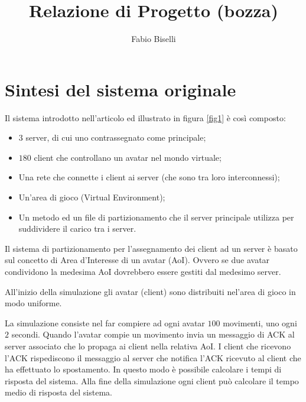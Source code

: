 \documentclass{article}
\author{Fabio Biselli}
\title{Relazione di Progetto (bozza)}
\date{}
\begin{document}
\maketitle

\section{Sintesi del sistema originale}
Il sistema introdotto nell'articolo ed illustrato in figura \ref{fig1}
è così composto:
\begin{itemize}
\item
$3$ server, di cui uno contrassegnato come principale;
\item
$180$ client che controllano un avatar nel mondo virtuale;
\item
Una rete che connette i client ai server (che sono tra loro interconnessi);
\item
Un'area di gioco (Virtual Environment);
\item
Un metodo ed un file di partizionamento che il server principale utilizza per
suddividere il carico tra i server.
\end{itemize}

Il sistema di partizionamento per l'assegnamento dei client ad un server è
basato sul concetto di Area d'Interesse di un avatar (AoI). Ovvero se due
avatar condividono la medesima AoI dovrebbero essere gestiti dal medesimo
server.

All'inizio della simulazione gli avatar (client) sono distribuiti nel'area
di gioco in modo uniforme.  

La simulazione consiste nel far compiere ad ogni avatar $100$ movimenti, uno
ogni $2$ secondi. Quando l'avatar compie un movimento invia un messaggio di
ACK al server associato che lo propaga ai client nella relativa AoI.
I client che ricevono l'ACK rispediscono il messaggio al server che notifica
l'ACK ricevuto al client che ha effettuato lo spostamento. In questo modo è
possibile calcolare i tempi di risposta del sistema.
Alla fine della simulazione ogni client può calcolare il tempo medio di
risposta del sistema.
\end{document}
